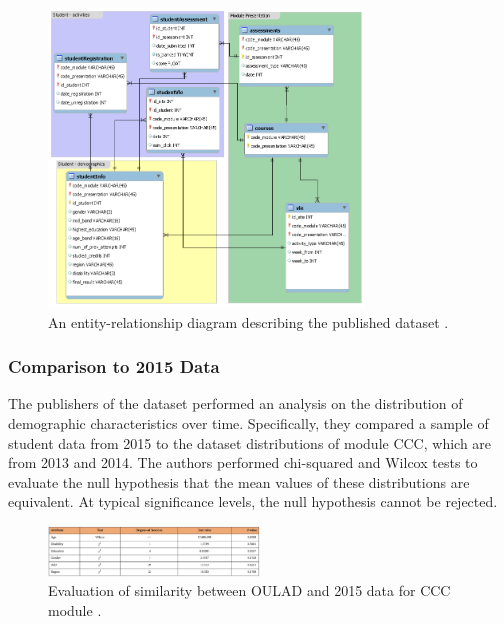\documentclass{article}
\begin{document}
            \begin{figure}
                \centering
                \includegraphics[width=0.75\textwidth]{raw_model}
                \caption{An entity-relationship diagram describing the published dataset \cite{oulad}.}
                \label{fig:oulad_schema}
            \end{figure}
        
        \subsubsection{Comparison to 2015 Data}
            The publishers of the dataset performed an analysis on the distribution of demographic characteristics over time.
            Specifically, they compared a sample of student data from 2015 to the dataset distributions of module CCC, which are from 2013 and 2014.
            The authors performed chi-squared and Wilcox tests to evaluate the null hypothesis that the mean values of these distributions are equivalent.
            At typical significance levels, the null hypothesis cannot be rejected.

            \begin{figure}
                \centering
                \includegraphics[width=0.5\textwidth]{oulad_vs_15}
                \caption{Evaluation of similarity between OULAD and 2015 data for CCC module \cite{oulad}.}
                \label{fig:oulad_vs_15}
            \end{figure}
\end{document}
